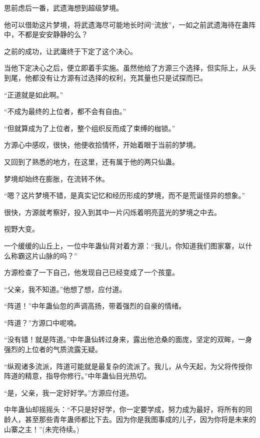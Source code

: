 \begin{this_body}
思前虑后一番，武遗海想到超级梦境。

他可以借助这片梦境，将武遗海尽可能地长时间“流放”，一如之前武遗海待在蛊阵中，不都是安安静静的么？

之前的成功，让武庸终于下定了这个决心。

当他下定决心之后，便立即着手实施。虽然他给了方源三个选择，但实际上，从头到尾，他都没有让方源有过选择的权利，充其量也只是试探而已。

“正道就是如此啊。”

“不成为最终的上位者，都不会有自由。”

“但就算成为了上位者，整个组织反而成了束缚的枷锁。”

方源心中感叹，很快，他便收拾情怀，开始着眼于当前的梦境。

又回到了熟悉的地方，在这里，还有属于他的两只仙蛊。

梦境却始终在膨胀，在流转不休。

“嗯？这片梦境不错，是真实记忆和经历形成的梦境，而不是荒诞怪异的想象。”

很快，方源就考察好，投入到其中一片闪烁着明亮蓝光的梦境之中去。

视野大变。

一个缓缓的山丘上，一位中年蛊仙背对着方源：“我儿，你知道我们图家寨，以什么称霸这片山脉的吗？”

方源检查了一下自己，他发现自己已经变成了一个孩童。

“父亲，我不知道。”他想了想，应付道。

“阵道！”中年蛊仙忽的声调高扬，带着强烈的自豪的情绪。

“阵道？”方源口中呢喃。

“没有错！就是阵道。”中年蛊仙转过身来，露出他沧桑的面庞，坚定的双眸，一身强烈的上位者的气质流露无疑。

“纵观诸多流派，阵道可能就是最复杂的流派了。我儿，从今天起，为父将传授你阵道的精意，指导你修行。”中年蛊仙目光热切。

“是，父亲，我一定好好学。”方源应付道。

中年蛊仙却摇摇头：“不只是好好学，你一定要学成，努力成为最好，将所有的同龄人，甚至那些青年蛊师都比下去。因为你是我图事成的儿子，因为你将是未来的山寨之主！”(未完待续。)

\end{this_body}

